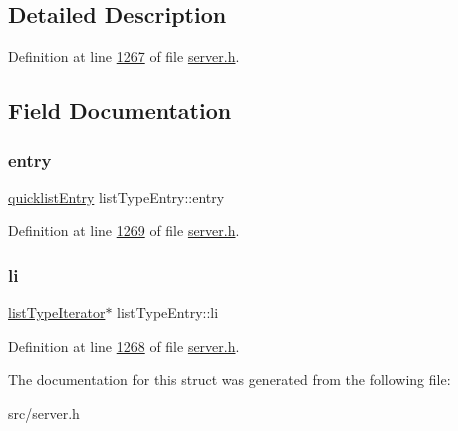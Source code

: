 \subsection{Detailed Description}


Definition at line \hyperlink{server_8h_source_l01267}{1267} of file \hyperlink{server_8h_source}{server.\+h}.



\subsection{Field Documentation}
\mbox{\label{structlistTypeEntry_a401bf1756d19b191677776171230639c}} 
\subsubsection{\texorpdfstring{entry}{entry}}
{\footnotesize\ttfamily \hyperlink{structquicklistEntry}{quicklist\+Entry} list\+Type\+Entry\+::entry}



Definition at line \hyperlink{server_8h_source_l01269}{1269} of file \hyperlink{server_8h_source}{server.\+h}.

\mbox{\label{structlistTypeEntry_a8c1e29e3167e162812c9576c694d57e9}} 
\subsubsection{\texorpdfstring{li}{li}}
{\footnotesize\ttfamily \hyperlink{structlistTypeIterator}{list\+Type\+Iterator}$\ast$ list\+Type\+Entry\+::li}



Definition at line \hyperlink{server_8h_source_l01268}{1268} of file \hyperlink{server_8h_source}{server.\+h}.



The documentation for this struct was generated from the following file\+:\begin{DoxyCompactItemize}
\item 
src/server.\+h\end{DoxyCompactItemize}
